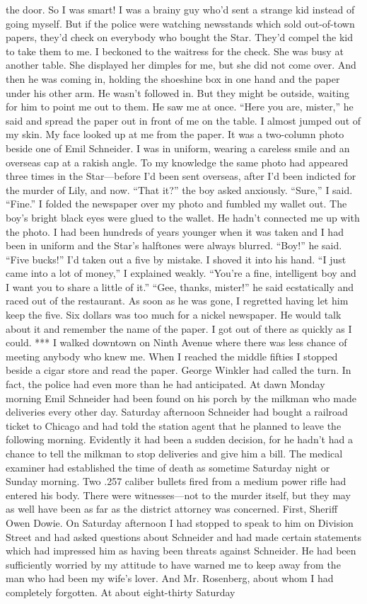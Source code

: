 \documentclass{novel}
\begin{document}
the door. So I was smart! I was a brainy guy who’d sent a strange kid instead of going myself. But if the police were watching newsstands which sold out-of-town papers, they’d check on everybody who bought the Star. They’d compel the kid to take them to me. I beckoned to the waitress for the check. She was busy at another table. She displayed her dimples for me, but she did not come over. And then he was coming in, holding the shoeshine box in one hand and the paper under his other arm. He wasn’t followed in. But they might be outside, waiting for him to point me out to them. He saw me at once. “Here you are, mister,” he said and spread the paper out in front of me on the table. I almost jumped out of my skin. My face looked up at me from the paper. It was a two-column photo beside one of Emil Schneider. I was in uniform, wearing a careless smile and an overseas cap at a rakish angle. To my knowledge the same photo had appeared three times in the Star—before I’d been sent overseas, after I’d been indicted for the murder of Lily, and now. “That it?” the boy asked anxiously. “Sure,” I said. “Fine.” I folded the newspaper over my photo and fumbled my wallet out. The boy’s bright black eyes were glued to the wallet. He hadn’t connected me up with the photo. I had been hundreds of years younger when it was taken and I had been in uniform and the Star’s halftones were always blurred. “Boy!” he said. “Five bucks!” I’d taken out a five by mistake. I shoved it into his hand. “I just came into a lot of money,” I explained weakly. “You’re a fine, intelligent boy and I want you to share a little of it.” “Gee, thanks, mister!” he said ecstatically and raced out of the restaurant. As soon as he was gone, I regretted having let him keep the five. Six dollars was too much for a nickel newspaper. He would talk about it and remember the name of the paper. I got out of there as quickly as I could. *** I walked downtown on Ninth Avenue where there was less chance of meeting anybody who knew me. When I reached the middle fifties I stopped beside a cigar store and read the paper. George Winkler had called the turn. In fact, the police had even more than he had anticipated. At dawn Monday morning Emil Schneider had been found on his porch by the milkman who made deliveries every other day. Saturday afternoon Schneider had bought a railroad ticket to Chicago and had told the station agent that he planned to leave the following morning. Evidently it had been a sudden decision, for he hadn’t had a chance to tell the milkman to stop deliveries and give him a bill. The medical examiner had established the time of death as sometime Saturday night or Sunday morning. Two .257 caliber bullets fired from a medium power rifle had entered his body. There were witnesses—not to the murder itself, but they may as well have been as far as the district attorney was concerned. First, Sheriff Owen Dowie. On Saturday afternoon I had stopped to speak to him on Division Street and had asked questions about Schneider and had made certain statements which had impressed him as having been threats against Schneider. He had been sufficiently worried by my attitude to have warned me to keep away from the man who had been my wife’s lover. And Mr. Rosenberg, about whom I had completely forgotten. At about eight-thirty Saturday 
\end{document}
